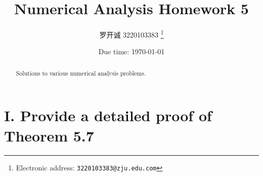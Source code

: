 \documentclass[a4paper]{article}
\begin{document}
\title{Numerical Analysis Homework 5}

\author{罗开诚 3220103383
  \thanks{Electronic address: \texttt{3220103383@zju.edu.com}}}

\date{Due time: \today}

\maketitle

\begin{abstract}
    Solutions to various numerical analysis problems.
\end{abstract}


\section*{I. Provide a detailed proof of Theorem 5.7}
\end{document}
